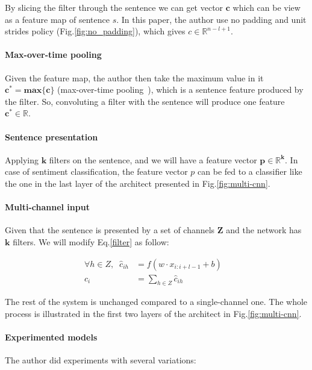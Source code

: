 By slicing the filter through the sentence we can get vector \(\bm{c}\) which can be view as a feature map of sentence \(s\). 
In this paper, the author use no padding and unit strides policy (Fig.\ref{fig:no_padding}), which gives \(c \in \mathbb{R}^{n-l+1}\).

\paragraph{Max-over-time pooling}\label{sec:max-overtime-pooling} Given the feature map, the author then take the maximum value in it \(\bm{c^* = max\{c\}}\) (max-over-time pooling~\cite{nlp-scratch}), which is a sentence feature produced by the filter.
So, convoluting a filter with the sentence will produce one feature \(\bm{c^* \in \mathbb{R}}\).

\paragraph{Sentence presentation} Applying \(\bm{k}\) filters on the sentence, and we will have a feature vector \(\bm{p \in \mathbb{R}^k}\). 
In case of sentiment classification, the feature vector \(p\) can be fed to a classifier like the one in the last layer of the architect presented in Fig.\ref{fig:multi-cnn}.

\paragraph{Multi-channel input} Given that the sentence is presented by a set of channels \(\bm{Z}\) and the network has \(\bm{k}\) filters. 
We will modify Eq.\eqref{filter} as follow: 

\begin{align}
    \forall h \in Z, \; \; \hat{c}_{ih} &= f(w \cdot x_{i:i+l-1} + b)& \\
    c_i &= \sum_{h \in Z} \hat{c}_{ih}&
\end{align}

The rest of the system is unchanged compared to a single-channel one.
The whole process is illustrated in the first two layers of the architect in Fig.\ref{fig:multi-cnn}.

\paragraph{Experimented models} The author did experiments with several variations:

